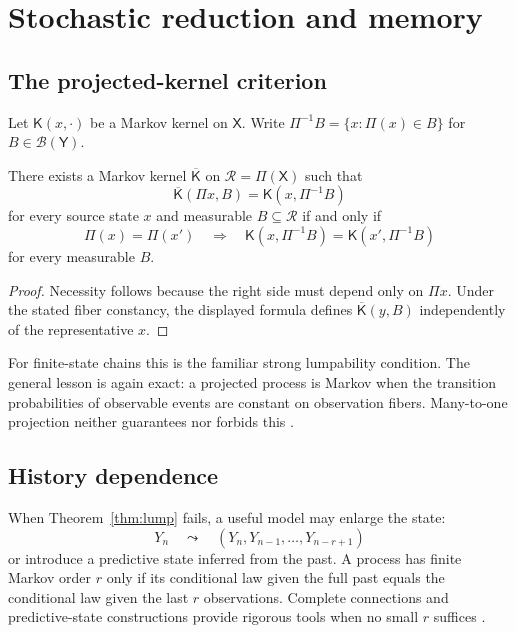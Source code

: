\documentclass[11pt]{article}
\newcommand{\X}{\mathsf X}
\newcommand{\Y}{\mathsf Y}
\newcommand{\Rset}{\mathcal R}
\newcommand{\B}{\mathcal B}
\newcommand{\K}{\mathsf K}
\begin{document}
\section{Stochastic reduction and memory}

\subsection{The projected-kernel criterion}

Let $\K(x,\cdot)$ be a Markov kernel on $\X$.  Write
$\Pi^{-1}B=\{x:\Pi(x)\in B\}$ for $B\in\B(\Y)$.

\begin{theorem}\label{thm:lump}
There exists a Markov kernel $\overline{\K}$ on $\Rset=\Pi(\X)$ such that
\[
  \overline{\K}(\Pi x,B)
  =\K(x,\Pi^{-1}B)
\]
for every source state $x$ and measurable $B\subseteq\Rset$ if and only if
\[
  \Pi(x)=\Pi(x')
  \quad\Longrightarrow\quad
  \K(x,\Pi^{-1}B)=\K(x',\Pi^{-1}B)
\]
for every measurable $B$.
\end{theorem}

\begin{proof}
Necessity follows because the right side must depend only on $\Pi x$.
Under the stated fiber constancy, the displayed formula defines
$\overline{\K}(y,B)$ independently of the representative $x$.
\end{proof}

For finite-state chains this is the familiar strong lumpability condition.
The general lesson is again exact: a projected process is Markov when the
transition probabilities of observable events are constant on observation
fibers.  Many-to-one projection neither guarantees nor forbids this
\cite{kemeny_snell,norris}.

\subsection{History dependence}

When Theorem~\ref{thm:lump} fails, a useful model may enlarge the state:
\[
  Y_n
  \quad\leadsto\quad
  (Y_n,Y_{n-1},\ldots,Y_{n-r+1})
\]
or introduce a predictive state inferred from the past.  A process has
finite Markov order $r$ only if its conditional law given the full past
equals the conditional law given the last $r$ observations.  Complete
connections and predictive-state constructions provide rigorous tools when
no small $r$ suffices \cite{walters1975,shalizi_crutchfield}.
\end{document}
